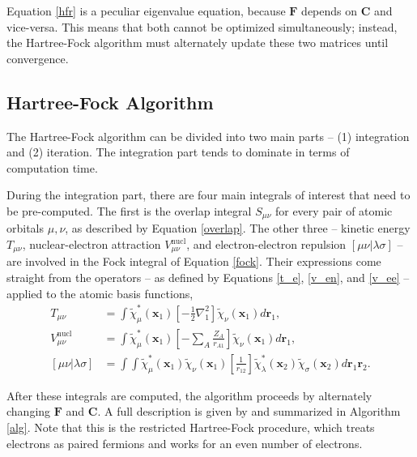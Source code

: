 \documentclass[12pt]{article}
\newcommand{\vect}[1]{\boldsymbol{#1}}
\begin{document}
Equation \ref{hfr} is a peculiar eigenvalue equation, because $\vect{F}$ depends on $\vect{C}$ and vice-versa.  This means that both cannot be optimized simultaneously; instead, the Hartree-Fock algorithm must alternately update these two matrices until convergence.  

\subsection{Hartree-Fock Algorithm}

The Hartree-Fock algorithm \cite{szabo2012} can be divided into two main parts -- (1) integration and (2) iteration.  The integration part tends to dominate in terms of computation time.  

During the integration part, there are four main integrals of interest that need to be pre-computed.  The first is the overlap integral $S_{\mu \nu}$ for every pair of atomic orbitals $\mu, \nu$, as described by Equation \ref{overlap}.  The other three -- kinetic energy $T_{\mu \nu}$, nuclear-electron attraction $V_{\mu \nu}^\text{nucl}$, and electron-electron repulsion $[\mu \nu | \lambda \sigma]$ -- are involved in the Fock integral of Equation \ref{fock}.  Their expressions come straight from the operators -- as defined by Equations \ref{t_e}, \ref{v_en}, and \ref{v_ee} -- applied to the atomic basis functions,
\begin{align}
T_{\mu \nu} &= \int \tilde{\chi}^*_\mu(\vect{x}_1) \left[-\frac{1}{2} \nabla_1^2\right] \tilde{\chi}_\nu (\vect{x}_1) d \vect{r}_1,  \\
V_{\mu \nu}^\text{nucl} &= \int \tilde{\chi}^*_\mu(\vect{x}_1) \left[ - \sum_{A} \frac{Z_A}{r_{A1}} \right] \tilde{\chi}_\nu(\vect{x}_1) d\vect{r}_1, \\
[\mu \nu | \lambda \sigma]  &= \int \int \tilde{\chi}^*_\mu(\vect{x}_1) \tilde{\chi}_\nu(\vect{x}_1)  \left[\frac{1}{r_{12}}\right] \tilde{\chi}^*_\lambda(\vect{x}_2) \tilde{\chi}_\sigma(\vect{x}_2) d \vect{r}_1 \vect{r}_2.
\end{align}

After these integrals are computed, the algorithm proceeds by alternately changing $\vect{F}$ and $\vect{C}$.  A full description is given by \cite{szabo2012} and summarized in Algorithm \ref{alg}.  Note that this is the restricted Hartree-Fock procedure, which treats electrons as paired fermions and works for an even number of electrons.  
\end{document}
